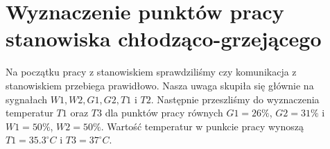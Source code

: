 \chapter{Wyznaczenie punktów pracy stanowiska chłodząco-grzejącego}
\label{thermal_punkty_pracy}
Na początku pracy z stanowiskiem sprawdziliśmy czy komunikacja z stanowiskiem przebiega prawidłowo. Nasza uwaga skupiła się głównie na sygnałach $W1, W2, G1, G2, T1$ i $T2$. Następnie przeszliśmy do wyznaczenia temperatur $T1$ oraz $T3$ dla punktów pracy równych $G1 = 26\%$, $G2 =31\%$ i $W1 = 50\%$, $W2 = 50\%$. Wartość temperatur w punkcie pracy wynoszą $T1 = \num{35.3}^{\circ} C$ i $T3 = \num{37}^{\circ} C$.



